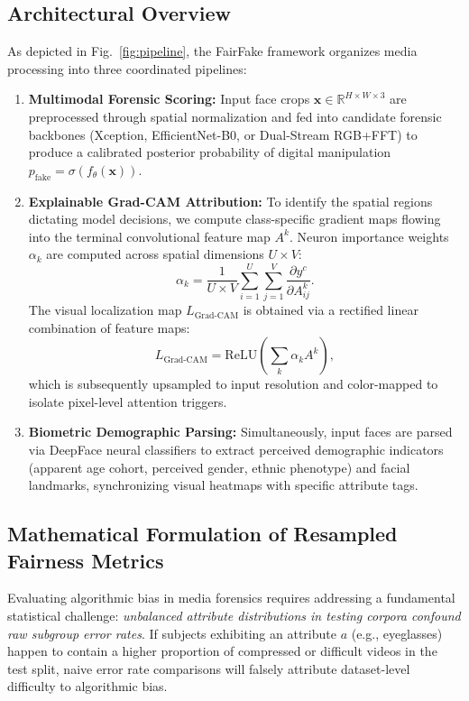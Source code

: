 \documentclass[journal]{IEEEtran}
\begin{document}
\subsection{Architectural Overview}
As depicted in Fig.~\ref{fig:pipeline}, the FairFake framework organizes media processing into three coordinated pipelines:
\begin{enumerate}
    \item \textbf{Multimodal Forensic Scoring:} Input face crops $\mathbf{x} \in \mathbb{R}^{H \times W \times 3}$ are preprocessed through spatial normalization and fed into candidate forensic backbones (Xception, EfficientNet-B0, or Dual-Stream RGB+FFT) to produce a calibrated posterior probability of digital manipulation $p_{\text{fake}} = \sigma(f_\theta(\mathbf{x}))$.
    \item \textbf{Explainable Grad-CAM Attribution:} To identify the spatial regions dictating model decisions, we compute class-specific gradient maps flowing into the terminal convolutional feature map $A^k$. Neuron importance weights $\alpha_k$ are computed across spatial dimensions $U \times V$:
    \begin{equation}
        \alpha_k = \frac{1}{U \times V} \sum_{i=1}^U \sum_{j=1}^V \frac{\partial y^c}{\partial A_{ij}^k}.
    \end{equation}
    The visual localization map $L_{\text{Grad-CAM}}$ is obtained via a rectified linear combination of feature maps:
    \begin{equation}
        L_{\text{Grad-CAM}} = \text{ReLU}\left(\sum_k \alpha_k A^k\right),
    \end{equation}
    which is subsequently upsampled to input resolution and color-mapped to isolate pixel-level attention triggers.
    \item \textbf{Biometric Demographic Parsing:} Simultaneously, input faces are parsed via DeepFace neural classifiers to extract perceived demographic indicators (apparent age cohort, perceived gender, ethnic phenotype) and facial landmarks, synchronizing visual heatmaps with specific attribute tags.
\end{enumerate}

\subsection{Mathematical Formulation of Resampled Fairness Metrics}
Evaluating algorithmic bias in media forensics requires addressing a fundamental statistical challenge: \textit{unbalanced attribute distributions in testing corpora confound raw subgroup error rates}. If subjects exhibiting an attribute $a$ (e.g., eyeglasses) happen to contain a higher proportion of compressed or difficult videos in the test split, naive error rate comparisons will falsely attribute dataset-level difficulty to algorithmic bias.
\end{document}
